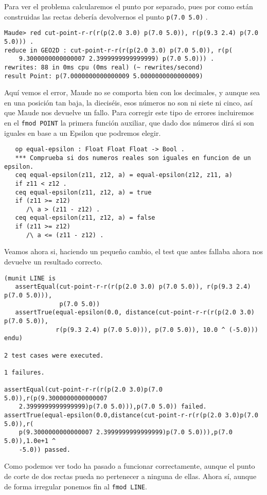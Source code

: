 Para ver el problema calcularemos el punto por separado, pues por como están construidas las rectas debería devolvernos el punto \texttt{p(7.0 5.0)} .\par
{\codesize
\begin{verbatim}
Maude> red cut-point-r-r(r(p(2.0 3.0) p(7.0 5.0)), r(p(9.3 2.4) p(7.0 5.0))) .
reduce in GEO2D : cut-point-r-r(r(p(2.0 3.0) p(7.0 5.0)), r(p(
    9.3000000000000007 2.3999999999999999) p(7.0 5.0))) .
rewrites: 88 in 0ms cpu (0ms real) (~ rewrites/second)
result Point: p(7.0000000000000009 5.0000000000000009)
\end{verbatim}
}
Aquí vemos el error, Maude no se comporta bien con los decimales, y aunque sea en una posición tan baja, la dieciséis, esos números no son ni siete ni cinco, así que Maude nos devuelve un fallo.
Para corregir este tipo de errores incluiremos en el \verb"fmod POINT" la primera función auxiliar, que dado dos números dirá si son iguales en base a un Epsilon que podremos elegir.\par
{\codesize
\begin{verbatim}
   op equal-epsilon : Float Float Float -> Bool .
   *** Comprueba si dos numeros reales son iguales en funcion de un epsilon.
   ceq equal-epsilon(z11, z12, a) = equal-epsilon(z12, z11, a)
   if z11 < z12 .
   ceq equal-epsilon(z11, z12, a) = true
   if (z11 >= z12) 
      /\ a > (z11 - z12) .
   ceq equal-epsilon(z11, z12, a) = false
   if (z11 >= z12) 
      /\ a <= (z11 - z12) .
\end{verbatim}   
}

Veamos ahora si, haciendo un pequeño cambio, el test que antes fallaba ahora nos devuelve un resultado correcto.
{\codesize
\begin{verbatim}
(munit LINE is
   assertEqual(cut-point-r-r(r(p(2.0 3.0) p(7.0 5.0)), r(p(9.3 2.4) p(7.0 5.0))),
               p(7.0 5.0))
   assertTrue(equal-epsilon(0.0, distance(cut-point-r-r(r(p(2.0 3.0) p(7.0 5.0)),
              r(p(9.3 2.4) p(7.0 5.0))), p(7.0 5.0)), 10.0 ^ (-5.0)))
endu)

2 test cases were executed.

1 failures.

assertEqual(cut-point-r-r(r(p(2.0 3.0)p(7.0 5.0)),r(p(9.3000000000000007
    2.3999999999999999)p(7.0 5.0))),p(7.0 5.0)) failed.
assertTrue(equal-epsilon(0.0,distance(cut-point-r-r(r(p(2.0 3.0)p(7.0 5.0)),r(
    p(9.3000000000000007 2.3999999999999999)p(7.0 5.0))),p(7.0 5.0)),1.0e+1 ^
    -5.0)) passed.

\end{verbatim} 
}
Como podemos ver todo ha pasado a funcionar correctamente, aunque el punto de corte de dos rectas pueda no pertenecer a ninguna de ellas. Ahora sí, aunque de forma irregular ponemos fin al \texttt{fmod LINE}. \par

